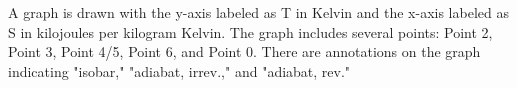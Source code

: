 A graph is drawn with the y-axis labeled as T in Kelvin and the x-axis labeled as S in kilojoules per kilogram Kelvin. The graph includes several points: Point 2, Point 3, Point 4/5, Point 6, and Point 0. There are annotations on the graph indicating "isobar," "adiabat, irrev.," and "adiabat, rev."